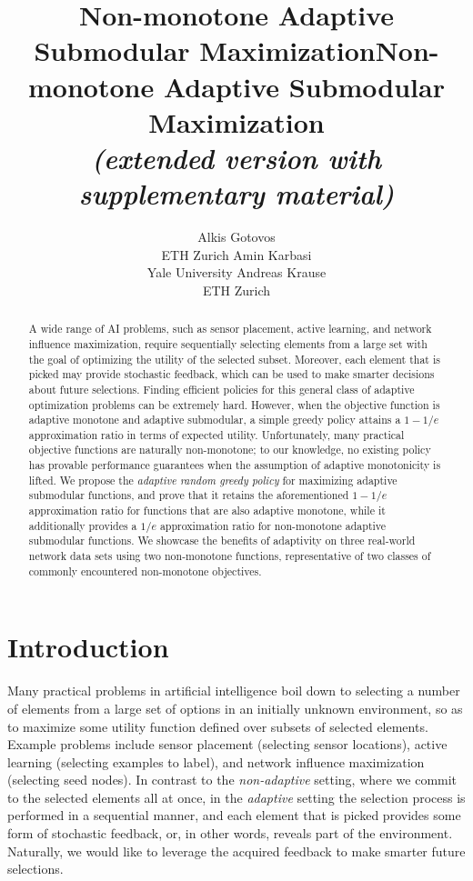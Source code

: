\documentclass{article}
\title{Non-monotone Adaptive Submodular Maximization}
\title{Non-monotone Adaptive Submodular Maximization\\\emph{\footnotesize (extended version with supplementary material)}}
\author{Alkis Gotovos\\
ETH Zurich
\And
Amin Karbasi\\
Yale University
\And
Andreas Krause\\
ETH Zurich}
\begin{document}
\maketitle

\begin{abstract}
A wide range of AI problems, such as sensor placement, active learning, and network influence maximization, require sequentially selecting elements from a large set with the goal of optimizing the utility of the selected subset.
Moreover, each element that is picked may provide stochastic feedback, which can be used to make smarter decisions about future selections.
Finding efficient policies for this general class of adaptive optimization problems can be extremely hard.
However, when the objective function is adaptive monotone and adaptive submodular, a simple greedy policy attains a $1-1/e$ approximation ratio in terms of expected utility.
Unfortunately, many practical objective functions are naturally non-monotone; to our knowledge, no existing policy has provable performance guarantees when the assumption of adaptive monotonicity is lifted.
We propose the \emph{adaptive random greedy policy} for maximizing adaptive submodular functions, and prove that it retains the aforementioned $1-1/e$ approximation ratio for functions that are also adaptive monotone, while it additionally provides a $1/e$ approximation ratio for non-monotone adaptive submodular functions.
We showcase the benefits of adaptivity on three real-world network data sets using two non-monotone functions, representative of two classes of commonly encountered non-monotone objectives.
\end{abstract}

\section{Introduction}

Many practical problems in artificial intelligence boil down to selecting a number of elements from a large set of options in an initially unknown environment, so as to maximize some utility function defined over subsets of selected elements.
Example problems include sensor placement (selecting sensor locations), active learning (selecting examples to label), and network influence maximization (selecting seed nodes).
In contrast to the \emph{non-adaptive} setting, where we commit to the selected elements all at once, in the \emph{adaptive} setting the selection process is performed in a sequential manner, and each element that is picked provides some form of stochastic feedback, or, in other words, reveals part of the environment.
Naturally, we would like to leverage the acquired feedback to make smarter future selections.
\end{document}
